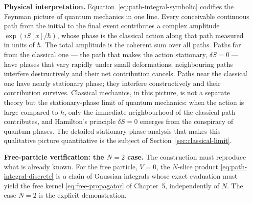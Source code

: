 \medskip\noindent\textbf{Physical interpretation.} Equation~\eqref{eq:path-integral-symbolic} codifies the Feynman picture of quantum mechanics in one line. Every conceivable continuous path from the initial to the final event contributes a complex amplitude $\exp(iS[x]/\hbar)$, whose phase is the classical action along that path measured in units of $\hbar$. The total amplitude is the coherent sum over all paths. Paths far from the classical one --- the path that makes the action stationary, $\delta S = 0$ --- have phases that vary rapidly under small deformations; neighbouring paths interfere destructively and their net contribution cancels. Paths near the classical one have nearly stationary phase; they interfere constructively and their contribution survives. Classical mechanics, in this picture, is not a separate theory but the stationary-phase limit of quantum mechanics: when the action is large compared to $\hbar$, only the immediate neighbourhood of the classical path contributes, and Hamilton's principle $\delta S = 0$ emerges from the conspiracy of quantum phases. The detailed stationary-phase analysis that makes this qualitative picture quantitative is the subject of Section~\ref{sec:classical-limit}.

\medskip\noindent\textbf{Free-particle verification: the $N=2$ case.} The construction must reproduce what is already known. For the free particle, $V = 0$, the $N$-slice product \eqref{eq:path-integral-discrete} is a chain of Gaussian integrals whose exact evaluation must yield the free kernel \eqref{eq:free-propagator} of Chapter~5, independently of $N$. The case $N = 2$ is the explicit demonstration.

